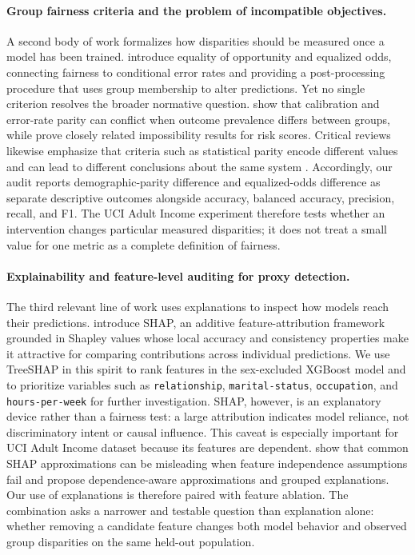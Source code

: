 \documentclass{article}
\begin{document}
\paragraph{Group fairness criteria and the problem of incompatible objectives.}
A second body of work formalizes how disparities should be measured once a
model has been trained. \citet{hardt2016equality} introduce equality of
opportunity and equalized odds, connecting fairness to conditional error rates
and providing a post-processing procedure that uses group membership to alter
predictions. Yet no single
criterion resolves the broader normative question. \citet{chouldechova2017fair}
show that calibration and error-rate parity can conflict when outcome
prevalence differs between groups, while \citet{kleinberg2017inherent} prove
closely related impossibility results for risk scores. Critical reviews likewise
emphasize that criteria such as statistical parity encode different values and
can lead to different conclusions about the same system
\citep{corbett2017algorithmic,barocas2019fairness}. Accordingly, our audit
reports demographic-parity difference and equalized-odds difference as
separate descriptive outcomes alongside accuracy, balanced accuracy, precision,
recall, and F1. The UCI Adult Income experiment therefore tests whether an intervention
changes particular measured disparities; it does not treat a small value for
one metric as a complete definition of fairness.

\paragraph{Explainability and feature-level auditing for proxy detection.}
The third relevant line of work uses explanations to inspect how models reach
their predictions. \citet{lundberg2017unified} introduce SHAP, an additive
feature-attribution framework grounded in Shapley values whose local accuracy
and consistency properties make it attractive for comparing contributions
across individual predictions. We use TreeSHAP in this spirit to rank features
in the sex-excluded XGBoost model and to prioritize variables such as
\texttt{relationship}, \texttt{marital-status}, \texttt{occupation}, and
\texttt{hours-per-week} for further investigation. SHAP, however, is an
explanatory device rather than a fairness test: a large attribution indicates
model reliance, not discriminatory intent or causal influence. This caveat is
especially important for UCI Adult Income dataset because its features are dependent.
\citet{aas2021explaining} show that common SHAP approximations can be
misleading when feature independence assumptions fail and propose
dependence-aware approximations and grouped explanations. Our use of
explanations is therefore paired with feature
ablation. The combination asks a narrower and testable question than
explanation alone: whether removing a candidate feature changes both model
behavior and observed group disparities on the same held-out population.
\end{document}
